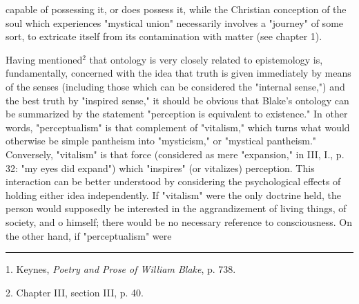 capable of possessing it, or does possess it, while the
Christian conception of the soul which experiences "mystical union" necessarily involves a "journey" of some sort, to
extricate itself from its contamination with matter (see chapter 1).\par
\vspace*{0.5\baselineskip}
Having mentioned$^{2}$ that ontology is very closely related to epistemology is, fundamentally, concerned with the idea that
truth is given immediately by means of the senses (including those which can be considered the "internal sense,") and the best truth
by "inspired sense," it should be obvious that Blake's ontology can be summarized by the statement "perception is
equivalent to existence." In other words, "perceptualism" is that complement of "vitalism," which turns what
would otherwise be simple pantheism into "mysticism," or "mystical pantheism." Conversely, "vitalism" is that force
(considered as mere "expansion," in III, I., p. 32: "my eyes did expand") which "inspires" (or vitalizes) perception.
This interaction can be better understood by considering the psychological effects of holding either idea independently.
If "vitalism" were the only doctrine held, the person would supposedly be interested in the aggrandizement of living things, of
society, and o himself; there would be no necessary reference to consciousness. On the other hand, if "perceptualism" were\linebreak
\null\par
\vspace*{-\baselineskip}
\vspace*{\fill}
\noindent\rule{0.25\textwidth}{0.4pt}\par
1. Keynes, \textit{Poetry and Prose of William Blake}, p. 738.\par
2. Chapter III, section III, p. 40.\par

\newpage

